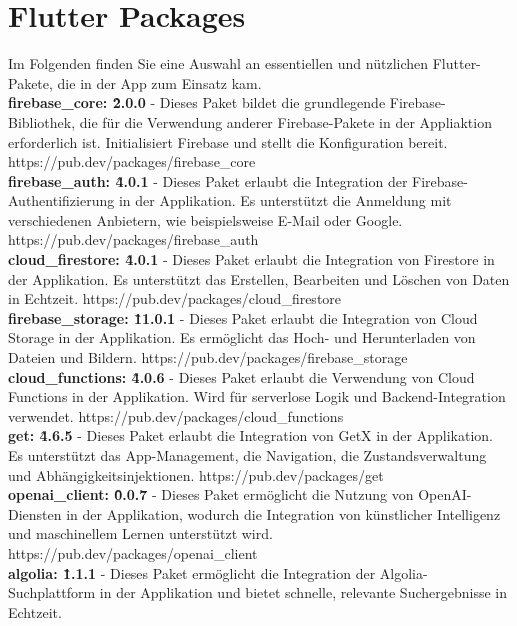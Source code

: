 \section{Flutter Packages}

Im Folgenden finden Sie eine Auswahl an essentiellen und nützlichen Flutter-Pakete, die in der App zum Einsatz kam.
\\
\textbf{firebase\_core: \^2.0.0}\cite{package_firebase_core} - Dieses Paket bildet die grundlegende Firebase-Bibliothek, die für die Verwendung anderer Firebase-Pakete in der Appliaktion erforderlich ist. Initialisiert Firebase und stellt die Konfiguration bereit.
https://pub.dev/packages/firebase\_core
\\
\textbf{firebase\_auth: \^4.0.1}\cite{package_firebase_auth} - Dieses Paket erlaubt die Integration der Firebase-Authentifizierung in der Applikation. Es unterstützt die Anmeldung mit verschiedenen Anbietern, wie beispielsweise E-Mail oder Google.
https://pub.dev/packages/firebase\_auth
\\
\textbf{cloud\_firestore: \^4.0.1}\cite{package_cloud_firestore} - Dieses Paket erlaubt die Integration von Firestore in der Applikation. Es unterstützt das Erstellen, Bearbeiten und Löschen von Daten in Echtzeit.
https://pub.dev/packages/cloud\_firestore
\\
\textbf{firebase\_storage: \^11.0.1}\cite{package_firebase_storage} - Dieses Paket erlaubt die Integration von Cloud Storage in der Applikation. Es ermöglicht das Hoch- und Herunterladen von Dateien und Bildern.
https://pub.dev/packages/firebase\_storage
\\
\textbf{cloud\_functions: \^4.0.6}\cite{package_cloud_functions} - Dieses Paket erlaubt die Verwendung von Cloud Functions in der Applikation. Wird für serverlose Logik und Backend-Integration verwendet.
https://pub.dev/packages/cloud\_functions
\\
\textbf{get: \^4.6.5}\cite{package_get} - Dieses Paket erlaubt die Integration von GetX in der Applikation. Es unterstützt das App-Management, die Navigation, die Zustandsverwaltung und Abhängigkeitsinjektionen.
https://pub.dev/packages/get
\\
\textbf{openai\_client: \^0.0.7}\cite{package_openai_client} - Dieses Paket ermöglicht die Nutzung von OpenAI-Diensten in der Applikation, wodurch die Integration von künstlicher Intelligenz und maschinellem Lernen unterstützt wird.
https://pub.dev/packages/openai\_client
\\
\textbf{algolia: \^1.1.1}\cite{package_algolia} - Dieses Paket ermöglicht die Integration der Algolia-Suchplattform in der Applikation und bietet schnelle, relevante Suchergebnisse in Echtzeit.
